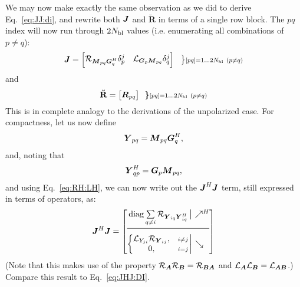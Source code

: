 \documentclass[useAMS,usenatbib]{mn2e}
\makeatletter
\newcommand{\mat}[1]{{\bmath{#1}}}
\newcommand{\JJ}{\mat{J}} %
\newcommand{\MM}{\mat{M}}
\newcommand{\GG}{\mat{G}}
\newcommand{\JHJ}{\JJ^H\JJ} %
\newcommand{\Matrix}[2]{\left [ \begin{array}{@{}#1@{}}#2\end{array} \right ]}
\newcommand{\AUGx}[1]{\mathbf{\breve{#1}}}
\newcommand{\RRr}{\AUGx{R}}
\newcommand{\Rop}[1]{\mathcal{R}_{{#1}}}
\newcommand{\Lop}[1]{\mathcal{L}_{{#1}}}
\numberwithin{equation}{section}
\makeatother
\begin{document}
We may now make exactly the same observation as we did to derive Eq.~\ref{eq:JJ:di}, and rewrite both $\JJ$ and $\RRr$ in terms of 
a single row block. The $pq$ index will now run through $2N_\mathrm{bl}$ values (i.e. enumerating all combinations of $p\ne q$):
\begin{equation}
\label{eq:JJ:pol}
\JJ = \Matrix{cc}{ 
\Rop{ \MM_{pq}\GG^H_q }\delta^j_p & 
\Lop{ \GG_p \MM_{pq}  }\delta^j_q \\
}~~ 
\bm{\big\}} \scriptstyle [pq]=1\dots 2\Nbl~(p\ne q)\\ 
\end{equation}
and 
\begin{equation}
\RRr = \Matrix{c}{ \mat{R}_{pq}}~~ 
\bm{\}} \scriptstyle [pq]=1\dots 2\Nbl~(p\ne q)\\ 
\end{equation}
This is in complete analogy to the derivations of the unpolarized case. For compactness, let us now define
\newcommand{\YY}{\mat{Y}}
\newcommand{\ZZ}{\mat{Z}}
\begin{equation}
\YY_{pq} = \MM_{pq} \GG^H_q,
\end{equation}
and, noting that 
\begin{equation}
\YY_{qp}^H = \GG_p \MM_{pq},
\end{equation}
and using Eq.~\ref{eq:RH:LH}, we can now write out the $\JHJ$ term, still expressed in terms of 
operators, as:
\begin{equation}
\label{eq:JHJ:pol}
\JHJ = \JHJblocks{
  \mathrm{diag}\sum\limits_{q\ne i} \Rop{\YY_{iq} \YY^H_{iq}} 
}{
  \left \{ 
  \begin{array}{@{}cc@{}}
   \Lop{ Y_{ji}  } \Rop{\YY_{ij}},&{\scriptstyle i\ne j} \\
   0, &{\scriptstyle i=j}
  \end{array} \right . 
}
\end{equation}
(Note that this makes use of the property $\Rop{\mat{A}}\Rop{\mat{B}}=\Rop{\mat{BA}}$ and 
$\Lop{\mat{A}}\Lop{\mat{B}}=\Lop{\mat{AB}}$.) Compare this result to Eq.~\ref{eq:JHJ:DI}.
\end{document}
